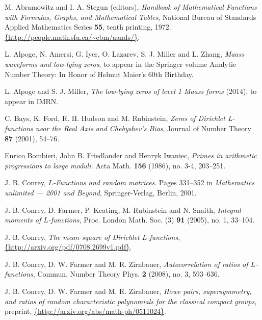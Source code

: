 \documentclass[12pt,reqno]{amsart}
\numberwithin{equation}{section}
\theoremstyle{plain}
\begin{document}
\begin{thebibliography}{GJMMNPPV}

M. Abramowitz and I. A. Stegun (editors), \emph{Handbook of Mathematical Functions
with Formulas, Graphs, and Mathematical Tables}, National Bureau of Standards
Applied Mathematics Series \textbf{55}, tenth printing, 1972. {\textcolor{blue}{\url{{http://people.math.sfu.ca/~cbm/aands/}}}}.

L. Alpoge, N. Amersi, G. Iyer, O. Lazarev, S. J. Miller and L. Zhang, \emph{Maass waveforms and low-lying zeros}, to appear in the Springer volume Analytic Number Theory: In Honor of Helmut Maier's 60th Birthday.

L. Alpoge and S. J. Miller, \emph{The low-lying zeros of level 1 Maass forms} (2014), to appear in IMRN.

C. Bays, K. Ford, R. H. Hudson and M. Rubinstein, \emph{Zeros of Dirichlet L-functions near the Real Axis and
Chebyshev's Bias}, Journal of Number Theory \textbf{87} (2001), 54--76.

 Enrico Bombieri, John B. Friedlander and Henryk Iwaniec, \emph{Primes in arithmetic progressions to large moduli.} Acta Math. \textbf{156} (1986),  no. 3-4, 203--251.

J. B. Conrey, \emph{$L$-Functions and random matrices}. Pages
331--352 in \emph{Mathematics unlimited --- 2001 and Beyond},
Springer-Verlag, Berlin, 2001.

J. B. Conrey, D. Farmer, P. Keating, M. Rubinstein and N. Snaith, \emph{Integral moments of $L$-functions}, Proc. London Math. Soc.
(3) \textbf{91} (2005), no. 1, 33--104.

J. B. Conrey, \emph{The mean-square of Dirichlet $L$-functions},\hfill\\ {\textcolor{blue}{\url{{http://arxiv.org/pdf/0708.2699v1.pdf}}}}.

\newblock J. B. Conrey, D. W. Farmer and M. R. Zirnbauer, \emph{Autocorrelation of ratios
of $L$-functions},  Commun. Number Theory Phys.  \textbf{2}  (2008),  no. 3, 593--636.

\newblock J. B. Conrey, D. W. Farmer and M. R. Zirnbauer, \emph{Howe pairs, supersymmetry,
and ratios of random characteristic polynomials for the classical
compact groups}, preprint,
{\textcolor{blue}{\url{{http://arxiv.org/abs/math-ph/0511024}}}}.


\end{thebibliography}
\end{document}

